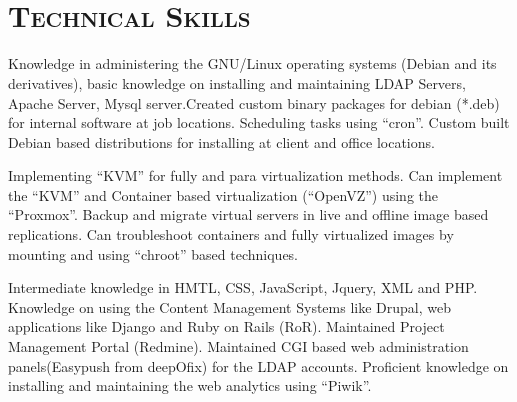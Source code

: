 \begin{resume}


\begin{formatb}
  \\
  \body\\
\end{formatb}

\section{\textsc{Technical Skills}}

\dates{}
\begin{position}
Knowledge in administering the GNU/Linux operating systems (Debian and
its derivatives), basic knowledge on installing and maintaining LDAP
Servers, Apache Server, Mysql server.Created custom binary packages
for debian (*.deb) for internal software at job locations. Scheduling
tasks using ``cron''. Custom built Debian based distributions for
installing at client and office locations.
\end{position}

\dates{}
\begin{position}
Implementing ``KVM'' for fully and para virtualization methods. Can
implement the ``KVM'' and Container based virtualization (``OpenVZ'')
using the ``Proxmox''. Backup and migrate virtual servers in live and
offline image based replications. Can troubleshoot containers and
fully virtualized images by mounting and using ``chroot'' based
techniques. 

\end{position}
 
\dates{}
\begin{position}
Intermediate knowledge in HMTL, CSS, JavaScript, Jquery, XML and 
PHP. Knowledge on using the Content Management Systems like Drupal,
web applications like Django and Ruby on Rails (RoR). Maintained
Project Management Portal (Redmine). Maintained CGI based web
administration panels(Easypush from deepOfix) for the LDAP
accounts. Proficient knowledge on installing and maintaining the web
analytics using ``Piwik''.


\end{position}
\end{resume}
